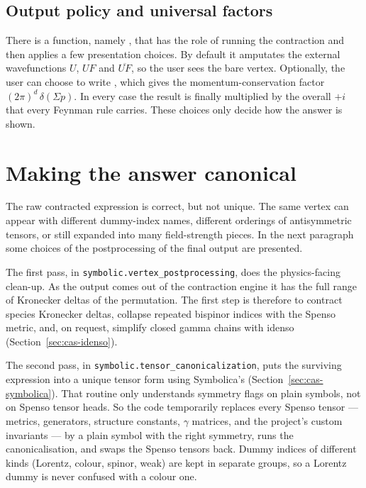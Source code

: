 \subsection{Output policy and universal factors}

There is a function, namely , that has the role of running the contraction and then applies a few presentation choices. By default it amputates the external wavefunctions $U$, $UF$ and $\overline{UF}$, so the user sees the bare vertex. Optionally, the user can choose to write , which gives the momentum-conservation factor $(2\pi)^d\,\delta(\Sigma p)$. In every case the result is finally multiplied by the overall $+i$ that every Feynman rule carries. These choices only decide how the answer is shown.

\section{Making the answer canonical}
\label{sec:internals-postprocessing}

The raw contracted expression is correct, but not unique. The same vertex can appear with different dummy-index names, different orderings of antisymmetric tensors, or still expanded into many field-strength pieces. In the next paragraph some choices of the postprocessing of the final output are presented.

The first pass, in \texttt{symbolic.vertex\_postprocessing}, does the physics-facing clean-up. As the output comes out of the contraction engine it has the full range of Kronecker deltas of the permutation. The first step is therefore to contract species Kronecker deltas, collapse repeated bispinor indices with the Spenso metric, and, on request, simplify closed gamma chains with idenso (Section~\ref{sec:cas-idenso}).

The second pass, in \texttt{symbolic.tensor\_canonicalization}, puts the surviving expression into a unique tensor form using Symbolica's  (Section~\ref{sec:cas-symbolica}). That routine only understands symmetry flags on plain symbols, not on Spenso tensor heads. So the code temporarily replaces every Spenso tensor --- metrics, generators, structure constants, $\gamma$ matrices, and the project's custom invariants --- by a plain symbol with the right symmetry, runs the canonicalisation, and swaps the Spenso tensors back. Dummy indices of different kinds (Lorentz, colour, spinor, weak) are kept in separate groups, so a Lorentz dummy is never confused with a colour one.

